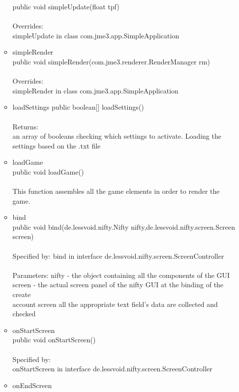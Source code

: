 \documentclass[letterpaper]{article}
\begin{document}
\begin{itemize}
\begin{itemize}
												public void simpleUpdate(float tpf) \\ \\
												Overrides: \\
												simpleUpdate in class com.jme3.app.SimpleApplication
										\item	simpleRender \\
												public void simpleRender(com.jme3.renderer.RenderManager rm) \\ \\
												Overrides: \\
												simpleRender in class com.jme3.app.SimpleApplication
										\item	loadSettings
												public boolean[] loadSettings() \\ \\
												Returns: \\
												an array of booleans checking which settings to activate. Loading the settings based on the .txt file
										\item	loadGame \\
												public void loadGame() \\ \\
												This function assembles all the game elements in order to render the game.
										\item	bind \\
												public void bind(de.lessvoid.nifty.Nifty nifty,de.lessvoid.nifty.screen.Screen screen) \\ \\
												Specified by:
												bind in interface de.lessvoid.nifty.screen.ScreenController \\ \\
												Parameters:
												nifty - the object containing all the components of the GUI \\
												screen - the actual screen panel of the nifty GUI at the binding of the create \\ account screen all the appropriate text field's data are collected and checked
										\item	onStartScreen \\
												public void onStartScreen() \\ \\
												Specified by: \\
												onStartScreen in interface de.lessvoid.nifty.screen.ScreenController
										\item	onEndScreen \\

\end{itemize}
\end{itemize}
\end{document}
